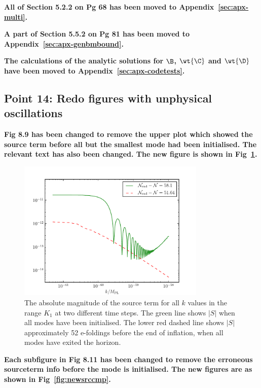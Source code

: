 \textbf{All of Section 5.2.2 on Pg 68 has been moved to Appendix~\ref{sec:apx-multi}.}

\textbf{A part of Section 5.5.2 on Pg 81 has been moved to Appendix~\ref{sec:apx-genbmbound}.}

\textbf{The calculations of the analytic solutions for $\B$, $\wt{\C}$ and $\wt{\D}$ have been
moved to Appendix~\ref{sec:apx-codetests}.}

\subsection{Point 14: Redo figures with unphysical oscillations}
\textbf{Fig 8.9 has been changed to remove the upper plot which showed the source term before all
but the smallest mode had been initialised. The relevant text has also been changed. The new figure
is shown in Fig~\ref{fig:src-3ns-2}.}

\begin{figure}[htbp]
\centering
\includegraphics[width=0.8\textwidth]{numerical/graphs/src_3ns-large}
\caption[Source Term at Two Different Times]{The absolute magnitude of the source 
term for all $k$ values in the range $K_1$ at two different time steps. The green line shows
$|S|$ when all modes have been initialised. The lower red dashed line shows $|S|$ approximately 
52 e-foldings before the end of inflation, when all modes have
exited the horizon.}
\label{fig:src-3ns-2}
\end{figure}

\textbf{Each subfigure in Fig 8.11 has been changed to remove the erroneous sourceterm info before
the mode is initialised. The new figures are as shown in Fig~\ref{fig:newsrccmp}.
}

